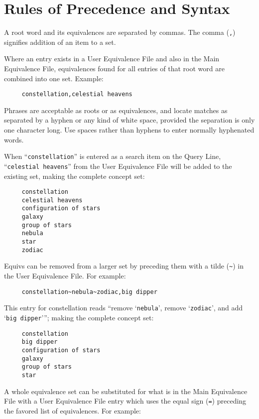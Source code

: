 \section{Rules of Precedence and Syntax}

A root word and its equivalences are separated by commas.  The comma
(\verb`,`) signifies addition of an item to a set.

Where an entry exists in a User Equivalence File and also in the Main
Equivalence File, equivalences found for all entries of that root word
are combined into one set.  Example:

\begin{verbatim}
     constellation,celestial heavens
\end{verbatim}

Phrases are acceptable as roots or as equivalences, and locate matches
as separated by a hyphen or any kind of white space, provided the
separation is only one character long.  Use spaces rather than hyphens
to enter normally hyphenated words.

When ``\verb`constellation`'' is entered as a search item on the Query
Line, ``\verb`celestial heavens`'' from the User Equivalence File will
be added to the existing set, making the complete concept set:

\begin{verbatim}
     constellation
     celestial heavens
     configuration of stars
     galaxy
     group of stars
     nebula
     star
     zodiac
\end{verbatim}

Equivs can be removed from a larger set by preceding them with a tilde
(\verb`~`) in the User Equivalence File.  For example:

\begin{verbatim}
     constellation~nebula~zodiac,big dipper
\end{verbatim}

This entry for constellation reads ``remove `\verb`nebula`', remove
`\verb`zodiac`', and add `\verb`big dipper`'''; making the complete
concept set:

\begin{verbatim}
     constellation
     big dipper
     configuration of stars
     galaxy
     group of stars
     star
\end{verbatim}

A whole equivalence set can be substituted for what is in the Main
Equivalence File with a User Equivalence File entry which uses the
equal sign (\verb`=`) preceding the favored list of equivalences.  For
example:

